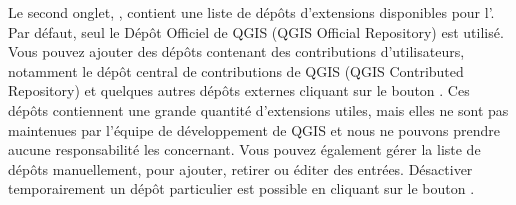 Le second onglet, , contient une liste de dépôts d'extensions disponibles pour l'. Par défaut, seul le Dépôt Officiel de QGIS (QGIS Official Repository) est utilisé. Vous pouvez ajouter des dépôts contenant des contributions d'utilisateurs, notamment le dépôt central de contributions de QGIS (QGIS Contributed Repository) et quelques autres dépôts externes cliquant sur le bouton . Ces dépôts contiennent une grande quantité d'extensions utiles, mais elles ne sont pas maintenues par l'équipe de développement de QGIS et nous ne pouvons prendre aucune responsabilité les concernant. Vous pouvez également gérer la liste de dépôts manuellement, pour ajouter, retirer ou éditer des entrées. Désactiver temporairement un dépôt particulier est possible en cliquant sur le bouton .



